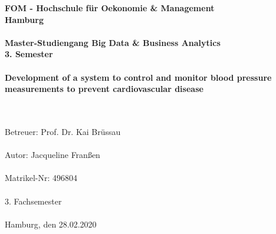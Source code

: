 		\begin{titlepage}
			\begin{center}
			\renewcommand{\baselinestretch}{1.5}
					\textbf{\large FOM - Hochschule für Oekonomie \& Management \\
						Hamburg \\
						\ \\
						Master-Studiengang Big Data \& Business Analytics \\
						3. Semester \\
						\ \\
						Development of a system to control and monitor blood pressure \ \\
						measurements to prevent cardiovascular disease \ \\
						\ \\
						}
						
					\textrm{
						\ \\
						Betreuer: Prof. Dr. Kai Brüssau \\
						\ \\
						Autor: Jacqueline Franßen \\
						\ \\
						Matrikel-Nr: 496804 \\
						\ \\
						3. Fachsemester \\
						\ \\
						Hamburg, den 28.02.2020 \\
						}
			\end{center}
		\end{titlepage}

%

			\setcounter{tocdepth}{3}
			\setcounter{secnumdepth}{3}		
			\thispagestyle{empty}
			\tableofcontents
			\newpage
			\listoffigures
			\listoftables

			\thispagestyle{empty}